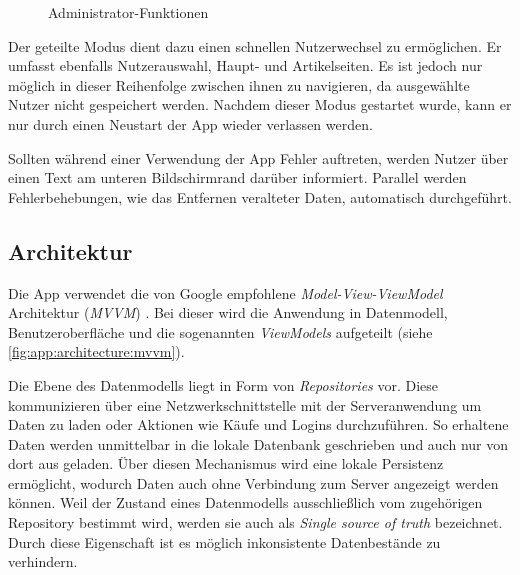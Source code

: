 \begin{figure}
	\qquad
	\caption{Administrator-Funktionen}%
	\label{fig:app:functionality:admin}%
\end{figure}

Der geteilte Modus dient dazu einen schnellen Nutzerwechsel zu ermöglichen.
Er umfasst ebenfalls Nutzerauswahl, Haupt- und Artikelseiten.
Es ist jedoch nur möglich in dieser Reihenfolge zwischen ihnen zu navigieren, da ausgewählte Nutzer nicht gespeichert werden.
Nachdem dieser Modus gestartet wurde, kann er nur durch einen Neustart der App wieder verlassen werden.

Sollten während einer Verwendung der App Fehler auftreten, werden Nutzer über einen Text am unteren Bildschirmrand darüber informiert.
Parallel werden Fehlerbehebungen, wie das Entfernen veralteter Daten, automatisch durchgeführt.

\subsection{Architektur}
\label{subsec:app:architecture}
Die App verwendet die von Google empfohlene \textit{Model-View-ViewModel} Architektur (\textit{MVVM}) \autocite{androidarchitecture}.
Bei dieser wird die Anwendung in Datenmodell, Benutzeroberfläche und die sogenannten \textit{ViewModels} aufgeteilt (siehe \autoref{fig:app:architecture:mvvm}).

Die Ebene des Datenmodells liegt in Form von \textit{Repositories} vor.
Diese kommunizieren über eine Netzwerkschnittstelle mit der Serveranwendung um Daten zu laden oder Aktionen wie Käufe und Logins durchzuführen.
So erhaltene Daten werden unmittelbar in die lokale Datenbank geschrieben und auch nur von dort aus geladen.
Über diesen Mechanismus wird eine lokale Persistenz ermöglicht, wodurch Daten auch ohne Verbindung zum Server angezeigt werden können.
Weil der Zustand eines Datenmodells ausschließlich vom zugehörigen Repository bestimmt wird, werden sie auch als \textit{Single source of truth} bezeichnet.
Durch diese Eigenschaft ist es möglich inkonsistente Datenbestände zu verhindern.

